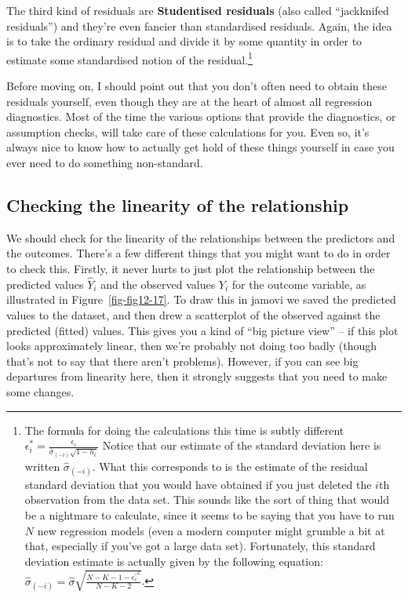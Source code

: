 \documentclass[
  a4paper,
]{book}
\begin{document}
The third kind of residuals are \textbf{Studentised residuals} (also
called ``jackknifed residuals'') and they're even fancier than
standardised residuals. Again, the idea is to take the ordinary residual
and divide it by some quantity in order to estimate some standardised
notion of the residual.\footnote{The formula for doing the calculations
  this time is subtly different
  \(\epsilon _i^*=\frac{\epsilon_i}{\hat{\sigma}_{(-i)}\sqrt{1-h_i}}\)
  Notice that our estimate of the standard deviation here is written
  \(\hat{\sigma}_{(-i)}\). What this corresponds to is the estimate of
  the residual standard deviation that you would have obtained if you
  just deleted the \(i\)th observation from the data set. This sounds
  like the sort of thing that would be a nightmare to calculate, since
  it seems to be saying that you have to run \(N\) new regression models
  (even a modern computer might grumble a bit at that, especially if
  you've got a large data set). Fortunately, this standard deviation
  estimate is actually given by the following equation:
  \(\hat{\sigma}_{(-i)}= \hat{\sigma}\sqrt{\frac{N-K-1-{\epsilon_i^{'}}^2}{N-K-2}}\).}

Before moving on, I should point out that you don't often need to obtain
these residuals yourself, even though they are at the heart of almost
all regression diagnostics. Most of the time the various options that
provide the diagnostics, or assumption checks, will take care of these
calculations for you. Even so, it's always nice to know how to actually
get hold of these things yourself in case you ever need to do something
non-standard.

\hypertarget{checking-the-linearity-of-the-relationship}{%
\subsection{Checking the linearity of the
relationship}\label{checking-the-linearity-of-the-relationship}}

We should check for the linearity of the relationships between the
predictors and the outcomes. There's a few different things that you
might want to do in order to check this. Firstly, it never hurts to just
plot the relationship between the predicted values \(\hat{Y}_i\) and the
observed values \(Y_i\) for the outcome variable, as illustrated in
Figure~\ref{fig-fig12-17}. To draw this in jamovi we saved the predicted
values to the dataset, and then drew a scatterplot of the observed
against the predicted (fitted) values. This gives you a kind of ``big
picture view'' -- if this plot looks approximately linear, then we're
probably not doing too badly (though that's not to say that there aren't
problems). However, if you can see big departures from linearity here,
then it strongly suggests that you need to make some changes.
\end{document}
